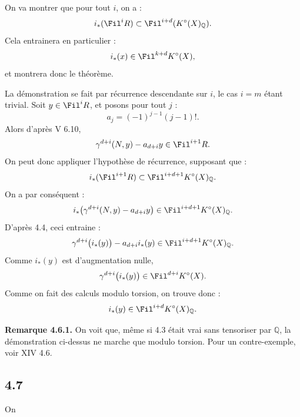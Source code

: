 On va
montrer que pour tout \(i\), on a :
\[
  i_*(\Fil^iR)\subset \Fil^{i+d}(K^\circ(X)_{\mathbb Q}).
\]
Cela entrainera en particulier :
\[
  i_*(x)\in\Fil^{k+d}K^\circ(X),
\]
et montrera donc le théorème.

La démonstration se fait par récurrence descendante sur \(i\), le cas \(i=m\) étant trivial. Soit \(y\in\Fil^iR\), et posons pour tout \(j\) :
\[
  a_j=(-1)^{j-1}(j-1)!.
\]
Alors d'après V 6.10,
\[
  \gamma^{d+i}(N,y)-a_{d+i}y\in\Fil^{i+1}R.
\]
On peut donc appliquer l'hypothèse de récurrence, supposant que :
\[
  i_*(\Fil^{i+1}R)\subset \Fil^{i+d+1}K^\circ(X)_{\mathbb Q}.
\]
On a par conséquent :
\[
  i_*\bigl(\gamma^{d+i}(N,y)-a_{d+i}y\bigr)
  \in\Fil^{i+d+1}K^\circ(X)_{\mathbb Q}.
\]
D'après 4.4, ceci entraine :
\[
  \gamma^{d+i}\bigl(i_*(y)\bigr)-a_{d+i}i_*(y)
  \in\Fil^{i+d+1}K^\circ(X)_{\mathbb Q}.
\]
Comme \(i_*(y)\) est d'augmentation nulle,
\[
  \gamma^{d+i}\bigl(i_*(y)\bigr)\in\Fil^{d+i}K^\circ(X).
\]
Comme on fait des calculs modulo torsion, on trouve donc :
\[
  i_*(y)\in\Fil^{i+d}K^\circ(X)_{\mathbb Q}.
\]

\textbf{Remarque 4.6.1.} On voit que, même si 4.3 était vrai sans tensoriser par \(\mathbb Q\), la démonstration ci-dessus ne marche que modulo torsion. Pour un contre-exemple, voir XIV 4.6.

\subsection*{4.7}

On
